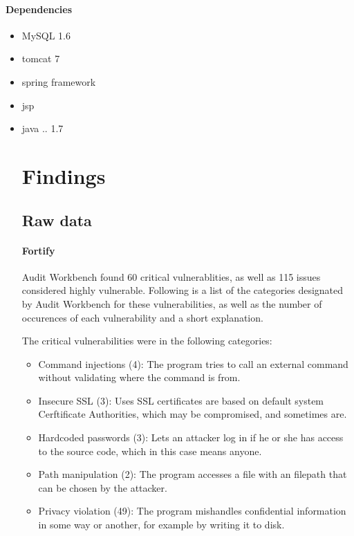 \documentclass{article}
\begin{document}
\paragraph{Dependencies}
  \begin{itemize}
    \item MySQL 1.6
    \item tomcat 7
    \item spring framework
    \item jsp
    \item java .. 1.7

\section{Findings}

\subsection{Raw data}

\paragraph{Fortify}

  Audit Workbench found 60 critical vulnerablities, as well as 115 issues
  considered highly vulnerable. Following is a list of the categories designated
  by Audit Workbench for these vulnerabilities, as well as the number of
  occurences of each vulnerability and a short explanation.

  The critical vulnerabilities were in the
  following categories:
  
  \begin{itemize}
  \item Command injections (4): The program tries to call an external command
    without validating where the command is from.
  \item Insecure SSL (3): Uses SSL certificates are based on default system
    Cerftificate Authorities, which may be compromised, and sometimes are.
  \item Hardcoded passwords (3): Lets an attacker log in if he or she has access
    to the source code, which in this case means anyone.
  \item Path manipulation (2): The program accesses a file with an filepath that
    can be chosen by the attacker.
  \item Privacy violation (49): The program mishandles confidential information
    in some way or another, for example by writing it to disk.
  \end{itemize}


\end{itemize}
\end{document}
